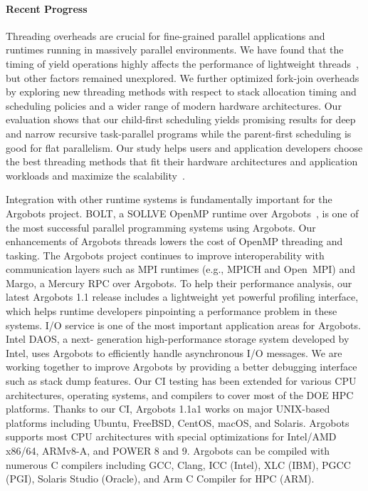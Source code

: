 \paragraph{Recent Progress}

Threading overheads are crucial for fine-grained parallel applications
and runtimes running in massively parallel environments.  We have
found that the timing of yield operations highly affects the
performance of lightweight threads~\cite{iwasaki2018}, but other
factors remained unexplored.  We further optimized fork-join overheads
by exploring new threading methods with respect to stack allocation
timing and scheduling policies and a wider range of modern hardware
architectures.  Our evaluation shows that our child-first scheduling
yields promising results for deep and narrow recursive task-parallel
programs while the parent-first scheduling is good for flat
parallelism.  Our study helps users and application developers choose
the best threading methods that fit their hardware architectures and
application workloads and maximize the scalability~\cite{iwasaki2020}.

Integration with other runtime systems is fundamentally important for
the Argobots project.  BOLT, a SOLLVE OpenMP runtime over
Argobots~\cite{BOLT}, is one of the most successful parallel
programming systems using Argobots.  Our enhancements of Argobots
threads lowers the cost of OpenMP threading and tasking.  The Argobots
project continues to improve interoperability with communication
layers such as MPI runtimes (e.g., MPICH and Open~MPI) and Margo, a
Mercury RPC over Argobots.  To help their performance analysis, our
latest Argobots 1.1 release includes a lightweight yet powerful
profiling interface, which helps runtime developers pinpointing a
performance problem in these systems.  I/O service is one of the most
important application areas for Argobots. Intel DAOS, a next-
generation high-performance storage system developed by Intel, uses
Argobots to efficiently handle asynchronous I/O messages.  We are
working together to improve Argobots by providing a better debugging
interface such as stack dump features. Our CI testing has been
extended for various CPU architectures, operating systems, and
compilers to cover most of the DOE HPC platforms.  Thanks to our CI,
Argobots 1.1a1 works on major UNIX-based platforms including Ubuntu,
FreeBSD, CentOS, macOS, and Solaris. Argobots supports most CPU
architectures with special optimizations for Intel/AMD x86/64,
ARMv8-A, and POWER 8 and 9. Argobots can be compiled with numerous C
compilers including GCC, Clang, ICC (Intel), XLC (IBM), PGCC (PGI),
Solaris Studio (Oracle), and Arm C Compiler for HPC (ARM).

